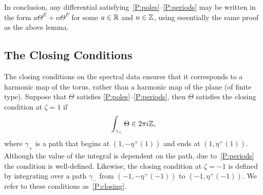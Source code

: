 \documentclass{article}
\begin{document}
In conclusion, any differential satisfying~\ref{P:poles}--\ref{P:periods} may be written in the form $a \Theta^E + n \Theta^P$ for some $a\in\mathbb{R}$ and $n\in\mathbb{Z}$, using essentially the same proof as the above lemma. 












\subsection{The Closing Conditions}
\label{subsec:closing conditions}
The closing conditions on the spectral data ensures that it corresponds to a harmonic map of the torus, rather than a harmonic map of the plane (of finite type). Suppose that $\Theta$ satisfies \ref{P:poles}--\ref{P:periods}, then $\Theta$ satisfies the closing condition at $\zeta=1$ if
\[
\int_{\gamma_{+}} \Theta \in 2\pi i \mathbb{Z},
\]
where $\gamma_+$ is a path that begins at $(1,-\eta^+(1))$ and ends at $(1,\eta^+(1))$. Although the value of the integral is dependent on the path, due to~\ref{P:periods} the condition is well-defined. Likewise, the closing condition at $\zeta=-1$ is defined by integrating over a path $\gamma_-$ from $(-1,-\eta^+(-1))$ to $(-1,\eta^+(-1))$. We refer to these conditions as~\ref{P:closing}.
\end{document}
